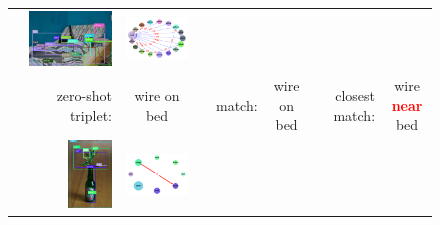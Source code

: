 \begin{figure}
\begin{tabular}{p{0.3cm}|rc|p{0.1cm}rc|p{0.1cm}rc}
		& \includegraphics[width=\figwidthvis, align=c]{2326876_baseline_zs_ours.png} & 
		\includegraphics[width=\figwidthvis, align=c]{2326876_baseline_zs_graph_ours.png} \Tstrutmore\Bstrut\\
		& zero-shot triplet: & {wire on bed} & & match: & wire on bed & & closest match: & {wire \textcolor{red}{\textbf{near}} bed} \Bstrut\\
		\cline{2-9} 
		& \includegraphics[width=\figwidthvis, height=1.8cm, align=c]{2315538_baseline_zs.png} &
		\includegraphics[width=\figwidthvis, align=c]{2315538_baseline_zs_graph_gt.png} & 

\end{tabular}
\end{figure}
